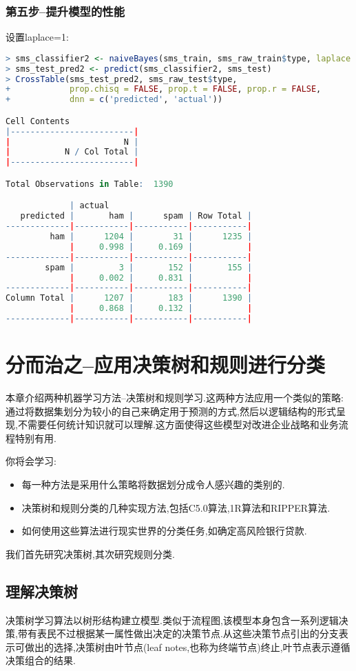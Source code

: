 \documentclass[11pt,a4paper,oneside]{book}
\begin{document}
\subsection{第五步--提升模型的性能}
设置laplace=1:
\begin{lstlisting}[language=r]
> sms_classifier2 <- naiveBayes(sms_train, sms_raw_train$type, laplace = 1)
> sms_test_pred2 <- predict(sms_classifier2, sms_test)
> CrossTable(sms_test_pred2, sms_raw_test$type,
+            prop.chisq = FALSE, prop.t = FALSE, prop.r = FALSE,
+            dnn = c('predicted', 'actual'))

Cell Contents
|-------------------------|
|                       N |
|           N / Col Total |
|-------------------------|

Total Observations in Table:  1390 

             | actual 
   predicted |       ham |      spam | Row Total | 
-------------|-----------|-----------|-----------|
         ham |      1204 |        31 |      1235 | 
             |     0.998 |     0.169 |           | 
-------------|-----------|-----------|-----------|
        spam |         3 |       152 |       155 | 
             |     0.002 |     0.831 |           | 
-------------|-----------|-----------|-----------|
Column Total |      1207 |       183 |      1390 | 
             |     0.868 |     0.132 |           | 
-------------|-----------|-----------|-----------|
\end{lstlisting}

\chapter{分而治之--应用决策树和规则进行分类}
本章介绍两种机器学习方法--决策树和规则学习.这两种方法应用一个类似的策略:通过将数据集划分为较小的自己来确定用于预测的方式,然后以逻辑结构的形式呈现,不需要任何统计知识就可以理解.这方面使得这些模型对改进企业战略和业务流程特别有用.

你将会学习:
\begin{itemize}
	\item 每一种方法是采用什么策略将数据划分成令人感兴趣的类别的.
	\item 决策树和规则分类的几种实现方法,包括C5.0算法,1R算法和RIPPER算法.
	\item 如何使用这些算法进行现实世界的分类任务,如确定高风险银行贷款.
\end{itemize}

我们首先研究决策树,其次研究规则分类.
\section{理解决策树}
决策树学习算法以树形结构建立模型.类似于流程图,该模型本身包含一系列逻辑决策,带有表民不过根据某一属性做出决定的决策节点.从这些决策节点引出的分支表示可做出的选择,决策树由叶节点(leaf notes,也称为终端节点)终止,叶节点表示遵循决策组合的结果.
\end{document}
